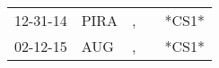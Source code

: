 \begin{supertabular}{lllll}
 12-31-14 &  PIRA &  , &   &  *CS1* \\
 02-12-15 &   AUG &  , &   &  *CS1* \\
\end{supertabular}
